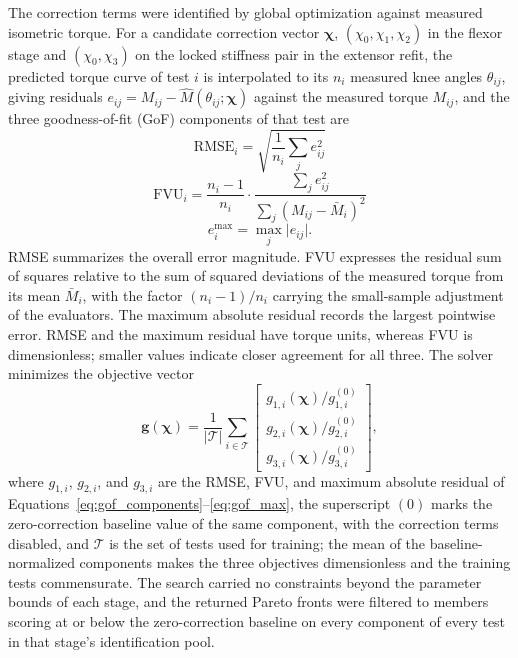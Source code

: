 \documentclass[utf8]{FrontiersinHarvard} %
\providecommand{\abs}[1]{\lvert#1\rvert}
\begin{document}
The correction terms were identified by global optimization against measured isometric torque. For a candidate correction vector $\boldsymbol{\chi}$, $(\chi_{0}, \chi_{1}, \chi_{2})$ in the flexor stage and $(\chi_{0}, \chi_{3})$ on the locked stiffness pair in the extensor refit, the predicted torque curve of test $i$ is interpolated to its $n_{i}$ measured knee angles $\theta_{ij}$, giving residuals $e_{ij} = M_{ij} - \hat{M}(\theta_{ij}; \boldsymbol{\chi})$ against the measured torque $M_{ij}$, and the three goodness-of-fit (GoF) components of that test are
\begin{equation}
\mathrm{RMSE}_{i} = \sqrt{\frac{1}{n_{i}}\sum_{j} e_{ij}^{2}}\label{eq:gof_components}
\end{equation}
\begin{equation}
\mathrm{FVU}_{i} = \frac{n_{i}-1}{n_{i}} \cdot \frac{\sum_{j} e_{ij}^{2}}{\sum_{j} (M_{ij} - \bar{M}_{i})^{2}}\label{eq:gof_fvu}
\end{equation}
\begin{equation}
e^{\max}_{i} = \max_{j} \abs{e_{ij}}.\label{eq:gof_max}
\end{equation}
RMSE summarizes the overall error magnitude. FVU expresses the residual sum of squares relative to the sum of squared deviations of the measured torque from its mean $\bar{M}_{i}$, with the factor $(n_{i}-1)/n_{i}$ carrying the small-sample adjustment of the evaluators. The maximum absolute residual records the largest pointwise error. RMSE and the maximum residual have torque units, whereas FVU is dimensionless; smaller values indicate closer agreement for all three. The solver minimizes the objective vector
\begin{equation}
\mathbf{g}(\boldsymbol{\chi}) = \frac{1}{\abs{\mathcal{T}}} \sum_{i \in \mathcal{T}}
\begin{bmatrix}
g_{1,i}(\boldsymbol{\chi})/g_{1,i}^{(0)} \\
g_{2,i}(\boldsymbol{\chi})/g_{2,i}^{(0)} \\
g_{3,i}(\boldsymbol{\chi})/g_{3,i}^{(0)}
\end{bmatrix},
\label{eq:gof_objective}
\end{equation}
where $g_{1,i}$, $g_{2,i}$, and $g_{3,i}$ are the RMSE, FVU, and maximum absolute residual of Equations~\eqref{eq:gof_components}--\eqref{eq:gof_max}, the superscript $(0)$ marks the zero-correction baseline value of the same component, with the correction terms disabled, and $\mathcal{T}$ is the set of tests used for training; the mean of the baseline-normalized components makes the three objectives dimensionless and the training tests commensurate. The search carried no constraints beyond the parameter bounds of each stage, and the returned Pareto fronts were filtered to members scoring at or below the zero-correction baseline on every component of every test in that stage's identification pool.
\end{document}
